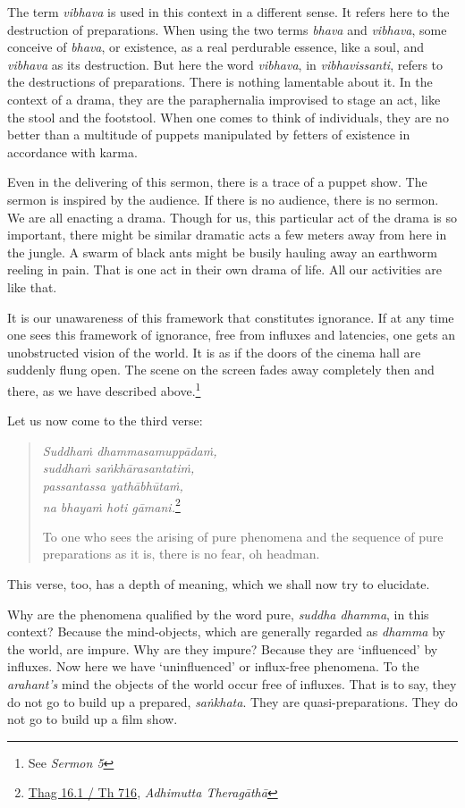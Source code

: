 The term \emph{vibhava} is used in this context in a different sense. It refers here to the destruction of preparations. When using the two terms \emph{bhava} and \emph{vibhava}, some conceive of \emph{bhava}, or existence, as a real perdurable essence, like a soul, and \emph{vibhava} as its destruction. But here the word \emph{vibhava}, in \emph{vibhavissanti}, refers to the destructions of preparations. There is nothing lamentable about it. In the context of a drama, they are the paraphernalia improvised to stage an act, like the stool and the footstool. When one comes to think of individuals, they are no better than a multitude of puppets manipulated by fetters of existence in accordance with karma.

Even in the delivering of this sermon, there is a trace of a puppet show. The sermon is inspired by the audience. If there is no audience, there is no sermon. We are all enacting a drama. Though for us, this particular act of the drama is so important, there might be similar dramatic acts a few meters away from here in the jungle. A swarm of black ants might be busily hauling away an earthworm reeling in pain. That is one act in their own drama of life. All our activities are like that.

It is our unawareness of this framework that constitutes ignorance. If at any time one sees this framework of ignorance, free from influxes and latencies, one gets an unobstructed vision of the world. It is as if the doors of the cinema hall are suddenly flung open. The scene on the screen fades away completely then and there, as we have described above.\footnote{See \emph{Sermon 5}}

Let us now come to the third verse:

\begin{quote}
\emph{Suddhaṁ dhammasamuppādaṁ,}\\
\emph{suddhaṁ saṅkhārasantatiṁ,}\\
\emph{passantassa yathābhūtaṁ,}\\
\emph{na bhayaṁ hoti gāmani.}\footnote{\href{https://suttacentral.net/thag16.1/pli/ms}{Thag 16.1 / Th 716}, \emph{Adhimutta Theragāthā}}

To one who sees the arising of pure phenomena and the sequence of pure preparations as it is, there is no fear, oh headman.
\end{quote}

This verse, too, has a depth of meaning, which we shall now try to elucidate.

Why are the phenomena qualified by the word pure, \emph{suddha dhamma}, in this context? Because the mind-objects, which are generally regarded as \emph{dhamma} by the world, are impure. Why are they impure? Because they are `influenced' by influxes. Now here we have `uninfluenced' or influx-free phenomena. To the \emph{arahant's} mind the objects of the world occur free of influxes. That is to say, they do not go to build up a prepared, \emph{saṅkhata}. They are quasi-preparations. They do not go to build up a film show.

